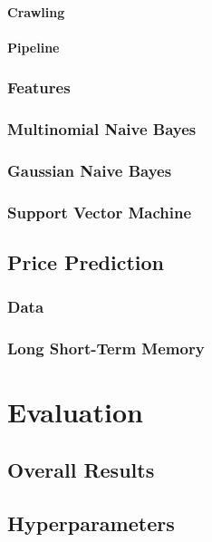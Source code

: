 \documentclass[12pt,a4paper,twoside,openright]{report}
\begin{document}
\subsubsection{Crawling}

\subsubsection{Pipeline}

\subsection{Features}

\subsection{Multinomial Naive Bayes}

\subsection{Gaussian Naive Bayes}

\subsection{Support Vector Machine}

\section{Price Prediction}

\subsection{Data}

\subsection{Long Short-Term Memory}
\label{sec:ImplLSTM}

\chapter{Evaluation}

\section{Overall Results}

\section{Hyperparameters}
\end{document}
